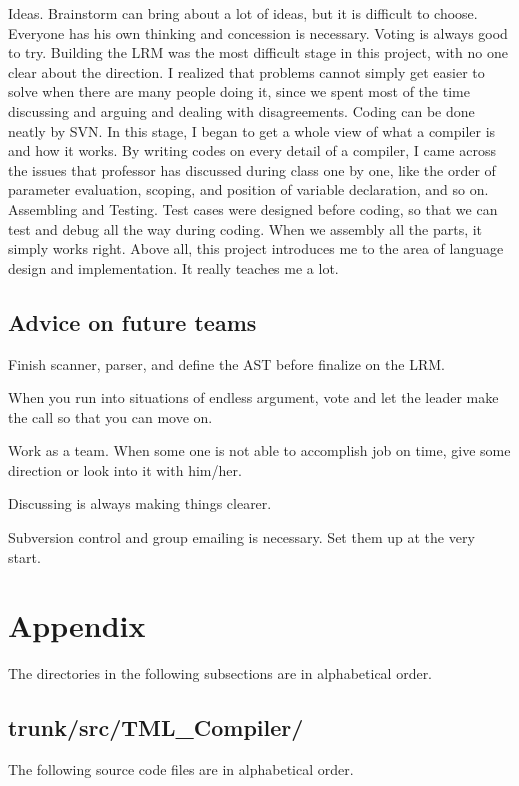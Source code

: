 \documentclass[12pt,psfig,a4]{article}
\begin{document}
Ideas. Brainstorm can bring about a lot of ideas, but it is difficult to choose. Everyone has his own thinking and concession is necessary. Voting is always good to try.
Building the LRM was the most difficult stage in this project, with no one clear about the direction. I realized that problems cannot simply get easier to solve when there are many people doing it, since we spent most of the time discussing and arguing and dealing with disagreements.
Coding can be done neatly by SVN. In this stage, I began to get a whole view of what a compiler is and how it works. By writing codes on every detail of a compiler, I came across the issues that professor has discussed during class one by one, like the order of parameter evaluation, scoping, and position of variable declaration, and so on.
Assembling and Testing. Test cases were designed before coding, so that we can test and debug all the way during coding. When we assembly all the parts, it simply works right.
Above all, this project introduces me to the area of language design and implementation. It really teaches me a lot.

\subsection{Advice on future teams}
Finish scanner, parser, and define the AST before finalize on the LRM.

When you run into situations of endless argument, vote and let the leader make the call so that you can move on.

Work as a team. When some one is not able to accomplish job on time, give some direction or look into it with him/her.

Discussing is always making things clearer.

Subversion control and group emailing is necessary. Set them up at the very start.


\pagebreak
\section{Appendix}
The directories in the following subsections are in alphabetical order.

\subsection{trunk/src/TML\_Compiler/}
The following source code files are in alphabetical order.
\end{document}
